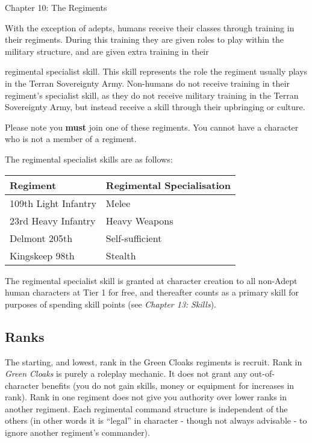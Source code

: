 \documentclass{scrbook}
\begin{document}
Chapter 10: The Regiments

With the exception of adepts, humans receive their classes through training in their regiments. During this training they are given roles to play within the military structure, and are given extra training in their

regimental specialist skill. This skill represents the role the regiment usually plays in the Terran Sovereignty Army. Non-humans do not receive training in their regiment's specialist skill, as they do not receive military training in the Terran Sovereignty Army, but instead receive a skill through their upbringing or culture.

Please note you \textbf{must} join one of these regiments. You cannot have a character who is not a member of a regiment.

The regimental specialist skills are as follows:

\begin{table}
\begin{tabular}{|l|l|} \hline 
Regiment & Regimental Specialisation \\
 \hline 109th Light Infantry & Melee \\
 \hline 23rd Heavy Infantry & Heavy Weapons \\
 \hline Delmont 205th & Self-sufficient \\
 \hline Kingskeep 98th & Stealth \\
 \hline \end{tabular}

\end{table}

The regimental specialist skill is granted at character creation to all non-Adept human characters at Tier 1 for free, and thereafter counts as a primary skill for purposes of spending skill points (see \textit{Chapter 13:} \textit{Skills}).

\subsection{Ranks}

The starting, and lowest, rank in the Green Cloaks regiments is recruit. Rank in \textit{Green Cloaks} is purely a roleplay mechanic. It does not grant any out-of-character benefits (you do not gain skills, money or equipment for increases in rank). Rank in one regiment does not give you authority over lower ranks in another regiment. Each regimental command structure is independent of the others (in other words it is ``legal'' in character - though not always advisable - to ignore another regiment's commander).
\end{document}
